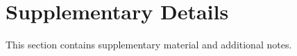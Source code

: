 \section{Supplementary Details}
\label{sec:appendix}

This section contains supplementary material and additional notes.
